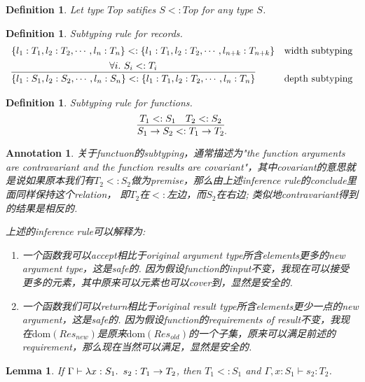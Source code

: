 \documentclass{article}
\theoremstyle{plain}
\newtheorem{lemma}[theorem]{Lemma}
\newtheorem{definition}[theorem]{Definition}
\newtheorem{annotation}[theorem]{Annotation}
\theoremstyle{nonumberplain}
\newcommand{\lam}[2]{\ensuremath{\lambda #1\ldotp~ #2}} %
\newcommand{\termtype}[2]{\ensuremath{#1:#2}}
\newcommand{\subtyp}[2]{#1<:#2}
\begin{document}
\begin{definition}
\rm Let type $Top$ satifies $\subtyp{S}{Top}$ for any type $S$. 
\end{definition}

\begin{definition}
\rm Subtyping rule for records.
$$
\begin{array}{ll}
\subtyp{\{l_1:T_1,l_2:T_2,\cdots,l_n:T_n\}}{\{l_1:T_1,l_2:T_2,\cdots,l_{n+k}:T_{n+k}\}} & \text{width subtyping} \\[0.5em]
\infer{\subtyp{\{l_1:S_1,l_2:S_2,\cdots,l_{n}:S_{n}\}}{\{l_1:T_1,l_2:T_2,\cdots,l_n:T_n\}}}{\forall i.~\subtyp{S_i}{T_i}} & \text{depth subtyping}
\end{array}
$$
\end{definition}

\begin{definition}
\rm Subtyping rule for functions.
$$
\infer{\subtyp{S_1 \to S_2}{T_1 \to T_2}}{\subtyp{T_1}{S_1} & \subtyp{T_2}{S_2}}.
$$
\end{definition}


\begin{annotation}
\rm 关于functuon的subtyping，通常描述为"the function arguments are contravariant and the function results are covariant"，其中covariant的意思就是说如果原本我们有$\subtyp{T_2}{S_2}$做为premise，那么由上述inference rule的conclude里面同样保持这个relation， 即$T_2$在$<:$左边，而$S_2$在右边; 类似地contravariant得到的结果是相反的. 

上述的inference rule可以解释为:
\begin{enumerate}
	\item 一个函数我可以accept相比于original argument type所含elements更多的new argument type，这是safe的. 因为假设function的input不变，我现在可以接受更多的元素，其中原来可以元素也可以cover到，显然是安全的. 
	\item 一个函数我们可以return相比于original result type所含elements更少一点的new argument，这是safe的. 因为假设function的requirements of result不变，我现在$\text{dom}(Res_{new})$是原来$\text{dom}(Res_{old})$的一个子集，原来可以满足前述的requirement，那么现在当然可以满足，显然是安全的. 
\end{enumerate}
\end{annotation}

\begin{lemma}
\rm If $\Gamma \vdash \termtype{\lam{\termtype{x}{S_1}}{s_2}}{T_1 \to T_2}$, then $\subtyp{T_1}{S_1}$ and $\Gamma,\termtype{x}{S_1} \vdash \termtype{s_2}{T_2}$. 
\end{lemma}
\end{document}
